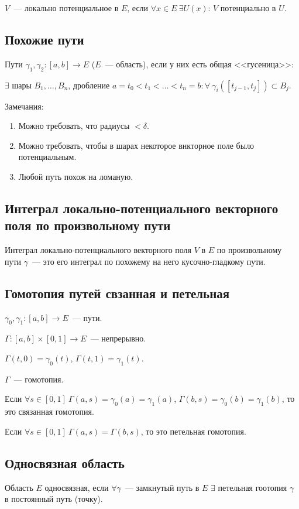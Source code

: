 \documentclass[paper=a4, fontsize=11pt]{article}
\begin{document}
$V$~--- локально потенциальное в $E$, если $\forall x \in E\ \exists U(x)$: $V$ потенциально в $U$.

\subsection{Похожие пути}
Пути $\gamma_1,\gamma_2: [a,b] \rightarrow E$ ($E$~--- область), если у них есть общая <<гусеница>>:

$\exists$ шары $B_1,\dots,B_n$, дробление $a=t_0<t_1<\dots<t_n=b: \forall \ \gamma_i([t_{j-1},t_j]) \subset B_j$.

Замечания:
\begin{enumerate}
    \item Можно требовать, что радиусы $<\delta$.
    \item Можно требовать, чтобы в шарах некоторое внкторное поле было потенциальным.
    \item Любой путь похож на ломаную.
\end{enumerate}

\subsection{Интеграл локально-потенциального векторного поля по произвольному пути}
Интеграл локально-потенциального векторного поля $V$ в $E$ по произвольному пути $\gamma$~--- это его интеграл по
похожему на него кусочно-гладкому пути.

\subsection{Гомотопия путей свзанная и петельная}
$\gamma_0,\gamma_1: [a,b] \rightarrow E$~--- пути.

$\Gamma:[a,b] \times [0,1] \rightarrow E$~--- непрерывно.

$\Gamma(t,0) = \gamma_0(t)$, $\Gamma(t,1) = \gamma_1(t)$.

$\Gamma$~--- гомотопия.

Если $\forall s \in [0,1]\ \Gamma(a,s)=\gamma_0(a)=\gamma_1(a)$, $\Gamma(b,s)=\gamma_0(b)=\gamma_1(b)$, то это связанная гомотопия.

Если $\forall s \in [0,1]\ \Gamma(a,s)=\Gamma(b,s)$, то это петельная гомотопия.

\subsection{Односвязная область}
Область $E$ односвязная, если $\forall \gamma$~--- замкнутый путь в $E$ $\exists$ петельная гоотопия $\gamma$ в постоянный путь (точку).
\end{document}
